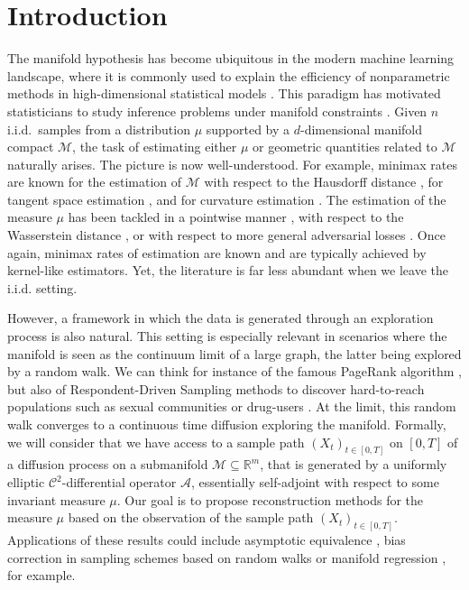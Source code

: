 \documentclass[10pt,a4paper]{article}
\newcommand{\R}{{\mathbb R}}
\newcommand\cA{\mathcal{A}}
\newcommand\cC{\mathcal{C}}
\newcommand\cM{\mathcal{M}}
\let \ssection=\section
\renewcommand{\section}{\setcounter{equation}{0}\ssection}
\begin{document}
 
\section{Introduction}\label{sec:intro}



The manifold hypothesis has become ubiquitous in the modern machine learning landscape, where it is commonly used to explain the efficiency of nonparametric methods in high-dimensional statistical models \cite{brown2022union}. This paradigm has motivated statisticians to study inference problems under manifold constraints \cite{niyogi2008finding, genovese2012minimax, aamarilevrard2018, aamarilevrard2019, divol2021minimax, puchkin2022structure}. Given $n$ i.i.d.~samples from a distribution $\mu$ supported by a $d$-dimensional manifold compact $\cM$, the task of estimating   either $\mu$ or geometric quantities related to $\cM$ naturally arises. The picture is now well-understood. For example, minimax rates  are known for the estimation of $\cM$ with respect to the Hausdorff distance \cite{genovese2012manifold}, for tangent space estimation \cite{tyagi2013tangent, aamarilevrard2019}, and for curvature estimation \cite{aamari2019estimating, aamarilevrard2019, berenfeld2022estimating, aamari2023optimal}.  
The estimation of the measure $\mu$ has been tackled in a pointwise manner \cite{berenfeld2021density}, with respect to the Wasserstein distance \cite{Divol2022, stephanovitch2023wasserstein}, or with respect to more general adversarial losses \cite{tang2023minimax}. Once again, minimax rates of estimation are known and are typically achieved by kernel-like estimators. Yet, the literature is far less abundant when we leave the i.i.d. setting. 

However, a framework in which the data is generated through an exploration process is also natural. This setting is especially relevant in scenarios  where the manifold is seen as the continuum limit of a large graph, the latter being explored by a random walk. We can think for instance of the famous PageRank algorithm \cite{Pagebrinmotwaniwinograd}, {but also of Respondent-Driven Sampling methods to discover hard-to-reach populations such as sexual communities or drug-users \cite{heckathorn,cousiendhersintranvo,tranvo,vo_esaimps}}. At the limit, this random walk converges to a continuous time diffusion exploring the manifold. %
Formally, we will consider that we have access to a sample path $(X_t)_{t\in [0,T]}$ on $[0,T]$ of a diffusion process on a submanifold $\cM\subseteq \R^m$, that is generated by a uniformly elliptic $\cC^2$-differential operator $\cA$, essentially self-adjoint with respect to some invariant measure $\mu$. Our goal is to propose reconstruction methods for the measure $\mu$ based on the observation of the sample path $(X_t)_{t\in [0,T]}$. {Applications of these results could include asymptotic equivalence \cite{dalalyan2006asymptotic}, bias correction in sampling schemes based on random walks \cite{tranvo} or manifold regression \cite{rosarousseau}, for example}.\\
\end{document}
